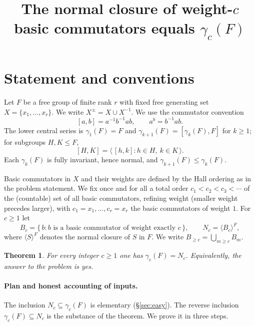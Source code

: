 \documentclass{amsart}
\newtheorem{theorem}{Theorem}
\theoremstyle{definition}
\theoremstyle{remark}
\begin{document}
\title{The normal closure of weight-$c$ basic commutators equals $\gamma_c(F)$}
\maketitle

\section{Statement and conventions}

Let $F$ be a free group of finite rank $r$ with fixed free generating set
$X=\{x_1,\dots,x_r\}$. We write $X^{\pm}=X\cup X^{-1}$. We use the commutator
convention
\[
[a,b]=a^{-1}b^{-1}ab ,\qquad a^{b}=b^{-1}ab .
\]
The lower central series is $\gamma_1(F)=F$ and $\gamma_{k+1}(F)=[\gamma_k(F),F]$
for $k\ge 1$; for subgroups $H,K\le F$,
\[
[H,K]=\big\langle\, [h,k] : h\in H,\ k\in K \,\big\rangle .
\]
Each $\gamma_k(F)$ is fully invariant, hence normal, and
$\gamma_{k+1}(F)\le\gamma_k(F)$.

Basic commutators in $X$ and their weights are defined by the Hall ordering as in
the problem statement. We fix once and for all a total order
$c_1<c_2<c_3<\cdots$ of the (countable) set of all basic commutators, refining
weight (smaller weight precedes larger), with $c_1=x_1,\dots,c_r=x_r$ the basic
commutators of weight $1$. For $c\ge 1$ let
\[
B_c=\{\,b : b \text{ is a basic commutator of weight exactly } c\,\},
\qquad
N_c=\langle B_c\rangle^{F},
\]
where $\langle S\rangle^{F}$ denotes the normal closure of $S$ in $F$. We write
$B_{\ge c}=\bigcup_{m\ge c}B_m$.

\begin{theorem}\label{thm:main}
For every integer $c\ge 1$ one has $\gamma_c(F)=N_c$. Equivalently, the answer to
the problem is \emph{yes}.
\end{theorem}

\paragraph{Plan and honest accounting of inputs.}
The inclusion $N_c\subseteq\gamma_c(F)$ is elementary (\S\ref{sec:easy}). The
reverse inclusion $\gamma_c(F)\subseteq N_c$ is the substance of the theorem. We
prove it in three steps.
\end{document}
